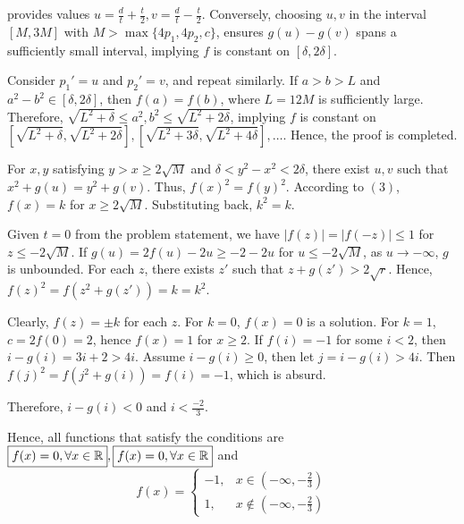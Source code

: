 \documentclass[11pt]{scrartcl}
\begin{document}
\begin{itemize}[label=, leftmargin=0em, itemsep=0.2em]
\begin{sol}
\begin{pro}
provides values \( u = \frac{d}{t} + \frac{t}{2}, v = \frac{d}{t} - \frac{t}{2} \). Conversely, choosing \( u, v \) in the interval \( [M,3M] \) with \( M > \max\{4p_1,4p_2,c\} \), ensures \( g(u) - g(v) \) spans a sufficiently small interval, implying \( f \) is constant on \( [\delta, 2\delta] \).

    Consider \( p_1' = u \) and \( p_2' = v \), and repeat similarly. If \( a > b > L \) and \( a^2 - b^2 \in [\delta, 2\delta] \), then \( f(a) = f(b) \), where \( L = 12M \) is sufficiently large. Therefore, \( \sqrt{L^2 + \delta} \leq a^2, b^2 \leq \sqrt{L^2 + 2\delta} \), implying \( f \) is constant on \( [\sqrt{L^2 + \delta}, \sqrt{L^2 + 2\delta}], [\sqrt{L^2 + 3\delta}, \sqrt{L^2 + 4\delta}], \ldots \). Hence, the proof is completed.
    \end{pro}

    For \( x, y \) satisfying \( y > x \geq 2\sqrt{M} \) and \( \delta < y^2 - x^2 < 2\delta \), there exist \( u, v \) such that \( x^2 + g(u) = y^2 + g(v) \). Thus, \( f(x)^2 = f(y)^2 \). According to \( (3) \), \( f(x) = k \) for \( x \geq 2\sqrt{M} \). Substituting back, \( k^2 = k \).

    Given \( t = 0 \) from the problem statement, we have \( |f(z)| = |f(-z)| \leq 1 \) for \( z \leq -2\sqrt{M} \). If \( g(u) = 2f(u) - 2u \geq -2-2u \) for \( u \leq -2\sqrt{M} \), as \( u \to -\infty \), \( g \) is unbounded. For each \( z \), there exists \( z' \) such that \( z + g(z') > 2\sqrt{r} \). Hence, \( f(z)^2 = f(z^2 + g(z')) = k = k^2 \).

    Clearly, \( f(z) = \pm k \) for each \( z \). For \( k = 0 \), \( f(x) = 0 \) is a solution. For \( k = 1 \), \( c = 2f(0) = 2 \), hence \( f(x) = 1 \) for \( x \geq 2 \). If \( f(i) = -1 \) for some \( i < 2 \), then \( i - g(i) = 3i + 2 > 4i \). Assume \( i - g(i) \geq 0 \), then let \( j = i - g(i) > 4i \). Then \( f(j)^2 = f(j^2 + g(i)) = f(i) = -1 \), which is absurd.

    Therefore, \( i - g(i) < 0 \) and \( i < \frac{-2}{3} \).

    Hence, all functions that satisfy the conditions are \( \boxed{f(x) = 0 ,\forall x\in \mathbb{R}}, \boxed{f(x) = 0 ,\forall x\in \mathbb{R}} \) and 
    \[
    \boxed{ f(x)=
    \left\{\begin{array}{rr}-1,&x\in \left(-\infty,-\frac{2}{3}\right)\\
        1,&x\not\in \left(-\infty,-\frac{2}{3}\right)
    \end{array}
    \right.
    }
    \]


\end{sol}
\end{itemize}
\end{document}
